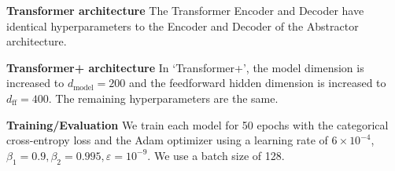 \textbf{Transformer architecture} The Transformer Encoder and Decoder have identical hyperparameters to the Encoder and Decoder of the Abstractor architecture.

\textbf{Transformer+ architecture} In `Transformer+', the model dimension is increased to $d_\mathrm{model} = 200$ and the feedforward hidden dimension is increased to $d_{\mathrm{ff}} = 400$. The remaining hyperparameters are the same.

\textbf{Training/Evaluation} We train each model for 50 epochs with the categorical cross-entropy loss and the Adam optimizer using a learning rate of $6 \times 10^{-4}$, $\beta_1 = 0.9, \beta_2 = 0.995, \varepsilon = 10^{-9}$. We use a batch size of 128.